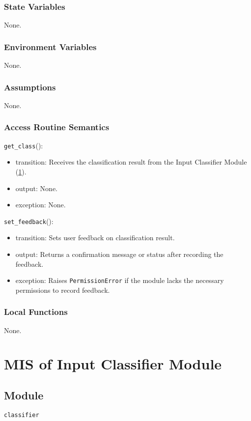 \documentclass[12pt, titlepage]{article}
\def\code#1{\texttt{#1}}
\begin{document}
\subsubsection{State Variables}
None.

\subsubsection{Environment Variables}
None.

\subsubsection{Assumptions}
None.

\subsubsection{Access Routine Semantics}

\noindent \code{get\_class}():
\begin{itemize}
  \item transition: Receives the classification result from the Input Classifier Module (\ref{In-class}).
  \item output: None.
  \item exception: None.
\end{itemize}

\noindent \code{set\_feedback}():
\begin{itemize}
  \item transition: Sets user feedback on classification result. 
  \item output: Returns a confirmation message or status after recording the feedback.
  \item exception: Raises \code{PermissionError} if the module lacks the necessary permissions to record feedback.
\end{itemize}


\subsubsection{Local Functions}
None.

\newpage

\section{MIS of Input Classifier Module} \label{In-class} 

\subsection{Module}
\code{classifier} 
\end{document}

